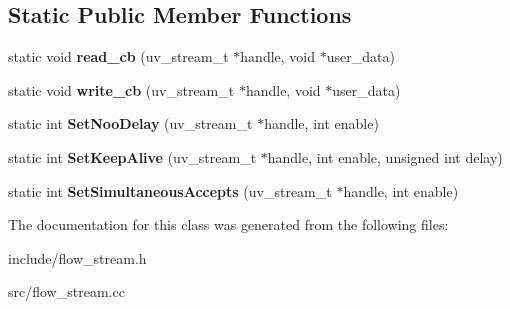 \subsection*{Static Public Member Functions}
\begin{DoxyCompactItemize}
\item 
static void {\bfseries read\+\_\+cb} (uv\+\_\+stream\+\_\+t $\ast$handle, void $\ast$user\+\_\+data)\hypertarget{classflow_1_1_flow_stream_a2d4b883debc8445e6a19275ff651ce75}{}\label{classflow_1_1_flow_stream_a2d4b883debc8445e6a19275ff651ce75}

\item 
static void {\bfseries write\+\_\+cb} (uv\+\_\+stream\+\_\+t $\ast$handle, void $\ast$user\+\_\+data)\hypertarget{classflow_1_1_flow_stream_a362b3d958ff77fcc6216c57cc6e7b283}{}\label{classflow_1_1_flow_stream_a362b3d958ff77fcc6216c57cc6e7b283}

\item 
static int {\bfseries Set\+Noo\+Delay} (uv\+\_\+stream\+\_\+t $\ast$handle, int enable)\hypertarget{classflow_1_1_flow_stream_ab457484da8497034bf1e7621fd8334e5}{}\label{classflow_1_1_flow_stream_ab457484da8497034bf1e7621fd8334e5}

\item 
static int {\bfseries Set\+Keep\+Alive} (uv\+\_\+stream\+\_\+t $\ast$handle, int enable, unsigned int delay)\hypertarget{classflow_1_1_flow_stream_a023662490a6558a232eb35efcf1e4d2a}{}\label{classflow_1_1_flow_stream_a023662490a6558a232eb35efcf1e4d2a}

\item 
static int {\bfseries Set\+Simultaneous\+Accepts} (uv\+\_\+stream\+\_\+t $\ast$handle, int enable)\hypertarget{classflow_1_1_flow_stream_a095d5e428b0ab66a45eab96a7a6df4b2}{}\label{classflow_1_1_flow_stream_a095d5e428b0ab66a45eab96a7a6df4b2}

\end{DoxyCompactItemize}


The documentation for this class was generated from the following files\+:\begin{DoxyCompactItemize}
\item 
include/flow\+\_\+stream.\+h\item 
src/flow\+\_\+stream.\+cc\end{DoxyCompactItemize}
